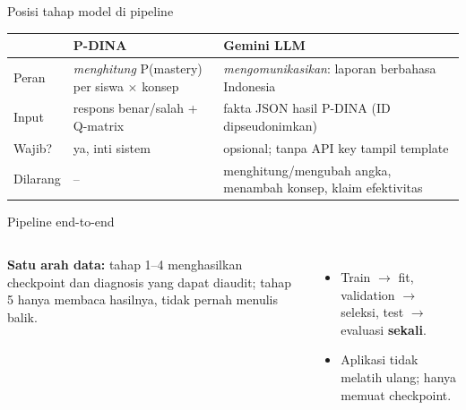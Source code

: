 \documentclass[aspectratio=169,10pt]{beamer}
\begin{document}
\begin{frame}{Posisi tahap model di pipeline}
  \centering
  \resizebox{0.92\linewidth}{!}{}
  \vspace{0.4em}

  \footnotesize
  \begin{tabularx}{\linewidth}{@{}l L L@{}}
    \toprule
    & \textbf{P-DINA} & \textbf{Gemini LLM} \\
    \midrule
    Peran & \emph{menghitung} P(mastery) per siswa $\times$ konsep & \emph{mengomunikasikan}: laporan berbahasa Indonesia \\
    Input & respons benar/salah + Q-matrix & fakta JSON hasil P-DINA (ID dipseudonimkan) \\
    Wajib? & ya, inti sistem & opsional; tanpa API key tampil template \\
    Dilarang & -- & menghitung/mengubah angka, menambah konsep, klaim efektivitas \\
    \bottomrule
  \end{tabularx}
\end{frame}

\begin{frame}{Pipeline end-to-end}
  \centering
  \resizebox{\linewidth}{!}{}
  \vspace{0.8em}

  \begin{columns}[T]
    \begin{infobox}
      \textbf{Satu arah data:} tahap 1--4 menghasilkan checkpoint dan diagnosis yang dapat diaudit;
      tahap 5 hanya membaca hasilnya, tidak pernah menulis balik.
    \end{infobox}
    \small
    \begin{itemize}
      \item Train $\to$ fit, validation $\to$ seleksi, test $\to$ evaluasi \textbf{sekali}.
      \item Aplikasi tidak melatih ulang; hanya memuat checkpoint.
    \end{itemize}
  \end{columns}
\end{frame}
\end{document}
